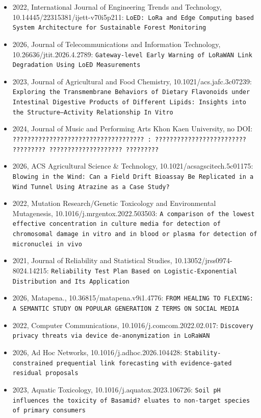 \begin{itemize}
\item 2022, International Journal of Engineering Trends and Technology, 10.14445/22315381/ijett-v70i5p211: \texttt{LoED: LoRa and Edge Computing based System Architecture for Sustainable Forest Monitoring}
\item 2026, Journal of Telecommunications and Information Technology, 10.26636/jtit.2026.4.2789: \texttt{Gateway-level Early Warning of LoRaWAN Link Degradation Using LoED Measurements}
\item 2023, Journal of Agricultural and Food Chemistry, 10.1021/acs.jafc.3c07239: \texttt{Exploring the Transmembrane Behaviors of Dietary Flavonoids under Intestinal Digestive Products of Different Lipids: Insights into the Structure--Activity Relationship In Vitro}
\item 2024, Journal of Music and Performing Arts Khon Kaen University, no DOI: \texttt{???????????????????????????????????? : ????????????????????????? ????????? ???????????????????? ?????????}
\item 2026, ACS Agricultural Science \& Technology, 10.1021/acsagscitech.5c01175: \texttt{Blowing in the Wind: Can a Field Drift Bioassay Be Replicated in a Wind Tunnel Using Atrazine as a Case Study?}
\item 2022, Mutation Research/Genetic Toxicology and Environmental Mutagenesis, 10.1016/j.mrgentox.2022.503503: \texttt{A comparison of the lowest effective concentration in culture media for detection of chromosomal damage in vitro and in blood or plasma for detection of micronuclei in vivo}
\item 2021, Journal of Reliability and Statistical Studies, 10.13052/jrss0974-8024.14215: \texttt{Reliability Test Plan Based on Logistic-Exponential Distribution and Its Application}
\item 2026, Matapena., 10.36815/matapena.v9i1.4776: \texttt{FROM HEALING TO FLEXING: A SEMANTIC STUDY ON POPULAR GENERATION Z TERMS ON SOCIAL MEDIA}
\item 2022, Computer Communications, 10.1016/j.comcom.2022.02.017: \texttt{Discovery privacy threats via device de-anonymization in LoRaWAN}
\item 2026, Ad Hoc Networks, 10.1016/j.adhoc.2026.104428: \texttt{Stability-constrained prequential link forecasting with evidence-gated residual proposals}
\item 2023, Aquatic Toxicology, 10.1016/j.aquatox.2023.106726: \texttt{Soil pH influences the toxicity of Basamid? eluates to non-target species of primary consumers}
\end{itemize}

